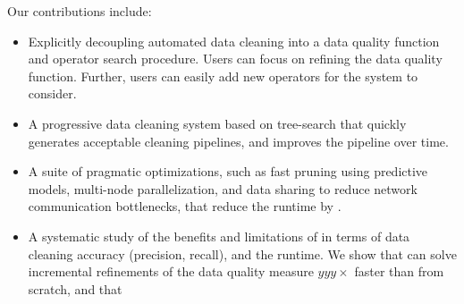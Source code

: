 \noindent Our contributions include:
\begin{itemize}[leftmargin=*, topsep=0mm, itemsep=0mm]
  \item Explicitly decoupling automated data cleaning into a data quality function and operator search procedure.  Users can focus on refining the data quality function.  Further, users can easily add new operators for the system to consider.
  \item A progressive data cleaning system based on tree-search that quickly generates acceptable cleaning pipelines, and improves the pipeline over time.   
  \item A suite of pragmatic optimizations, such as fast pruning using predictive models, multi-node parallelization, and data sharing to reduce network communication bottlenecks, that reduce the runtime by .
  \item A systematic study of the benefits and limitations of \sys in terms of data cleaning accuracy (precision, recall), and the runtime.  We show that \sys can solve incremental refinements of the data quality measure $yyy\times$ faster than from scratch, and that 
\end{itemize}


